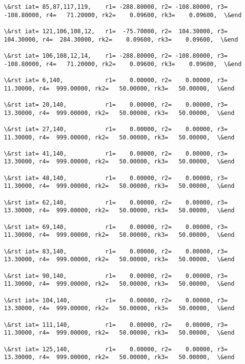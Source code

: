 \documentclass[11pt]{article}
\begin{document}
\begin{Verbatim}[commandchars=\\\{\}]
\&rst iat= 85,87,117,119,    r1= -288.80000, r2= -108.80000, r3= -108.80000, r4=   71.20000, rk2=    0.09600, rk3=    0.09600,  \&end

\&rst iat= 121,106,108,12,   r1=  -75.70000, r2=  104.30000, r3=  104.30000, r4=  284.30000, rk2=    0.09600, rk3=    0.09600,  \&end

\&rst iat= 106,108,12,14,    r1= -288.80000, r2= -108.80000, r3= -108.80000, r4=   71.20000, rk2=    0.09600, rk3=    0.09600,  \&end

\&rst iat= 6,140,            r1=    0.00000, r2=    0.00000, r3=   11.30000, r4=  999.00000, rk2=   50.00000, rk3=   50.00000,  \&end

\&rst iat= 20,140,           r1=    0.00000, r2=    0.00000, r3=   13.30000, r4=  999.00000, rk2=   50.00000, rk3=   50.00000,  \&end

\&rst iat= 27,140,           r1=    0.00000, r2=    0.00000, r3=   11.30000, r4=  999.00000, rk2=   50.00000, rk3=   50.00000,  \&end

\&rst iat= 41,140,           r1=    0.00000, r2=    0.00000, r3=   13.30000, r4=  999.00000, rk2=   50.00000, rk3=   50.00000,  \&end

\&rst iat= 48,140,           r1=    0.00000, r2=    0.00000, r3=   11.30000, r4=  999.00000, rk2=   50.00000, rk3=   50.00000,  \&end

\&rst iat= 62,140,           r1=    0.00000, r2=    0.00000, r3=   13.30000, r4=  999.00000, rk2=   50.00000, rk3=   50.00000,  \&end

\&rst iat= 69,140,           r1=    0.00000, r2=    0.00000, r3=   11.30000, r4=  999.00000, rk2=   50.00000, rk3=   50.00000,  \&end

\&rst iat= 83,140,           r1=    0.00000, r2=    0.00000, r3=   13.30000, r4=  999.00000, rk2=   50.00000, rk3=   50.00000,  \&end

\&rst iat= 90,140,           r1=    0.00000, r2=    0.00000, r3=   11.30000, r4=  999.00000, rk2=   50.00000, rk3=   50.00000,  \&end

\&rst iat= 104,140,          r1=    0.00000, r2=    0.00000, r3=   13.30000, r4=  999.00000, rk2=   50.00000, rk3=   50.00000,  \&end

\&rst iat= 111,140,          r1=    0.00000, r2=    0.00000, r3=   11.30000, r4=  999.00000, rk2=   50.00000, rk3=   50.00000,  \&end

\&rst iat= 125,140,          r1=    0.00000, r2=    0.00000, r3=   13.30000, r4=  999.00000, rk2=   50.00000, rk3=   50.00000,  \&end


\end{Verbatim}
\end{document}
